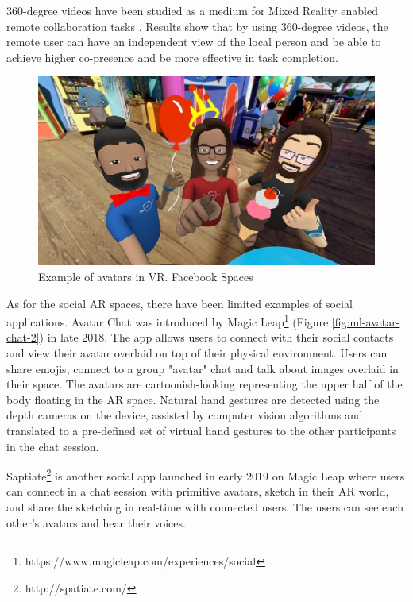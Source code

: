 360-degree videos have been studied as a medium for Mixed Reality enabled remote collaboration tasks \cite{Tang2017a, Lee2017, lee2017mixed, Lee2019}. Results show that by using 360-degree videos, the remote user can have an independent view of the local person and be able to achieve higher co-presence and be more effective in task completion. 

\begin{figure}
    \centering
    \includegraphics[width=0.8\linewidth]{images/20-background/facebook-spaces.eps}
    \caption{Example of avatars in VR. Facebook Spaces}
    \label{fig:facebook-spaces}
\end{figure}

As for the social AR spaces, there have been limited examples of social applications. Avatar Chat was introduced by Magic Leap\footnote{https://www.magicleap.com/experiences/social} (Figure \ref{fig:ml-avatar-chat-2}) in late 2018. The app allows users to connect with their social contacts and view their avatar overlaid on top of their physical environment. Users can share emojis, connect to a group "avatar" chat and talk about images overlaid in their space. The avatars are cartoonish-looking representing the upper half of the body floating in the AR space. Natural hand gestures are detected using the depth cameras on the device, assisted by computer vision algorithms and translated to a pre-defined set of virtual hand gestures to the other participants in the chat session. 

Saptiate\footnote{http://spatiate.com/} is another social app launched in early 2019 on Magic Leap where users can connect in a chat session with primitive avatars, sketch in their AR world, and share the sketching in real-time with connected users. The users can see each other's avatars and hear their voices. 

